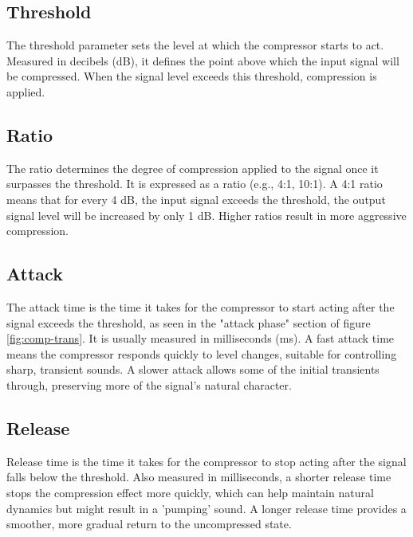\documentclass[10pt]{article}
\begin{document}
\begin{multicols*}{2}
            \subsection{Threshold}
                The threshold parameter sets the level at which the compressor starts to act. Measured in decibels (dB), it defines the point above which the input signal will be compressed. When the signal level exceeds this threshold, compression is applied.

            \subsection{Ratio}
                The ratio determines the degree of compression applied to the signal once it surpasses the threshold. It is expressed as a ratio (e.g., 4:1, 10:1). A 4:1 ratio means that for every 4 dB, the input signal exceeds the threshold, the output signal level will be increased by only 1 dB. Higher ratios result in more aggressive compression.

            \subsection{Attack}
                The attack time is the time it takes for the compressor to start acting after the signal exceeds the threshold, as seen in the "attack phase" section of figure \ref{fig:comp-trans}. It is usually measured in milliseconds (ms). A fast attack time means the compressor responds quickly to level changes, suitable for controlling sharp, transient sounds. A slower attack allows some of the initial transients through, preserving more of the signal's natural character.

            \subsection{Release}
                Release time is the time it takes for the compressor to stop acting after the signal falls below the threshold. Also measured in milliseconds, a shorter release time stops the compression effect more quickly, which can help maintain natural dynamics but might result in a 'pumping' sound. A longer release time provides a smoother, more gradual return to the uncompressed state.
            
                \noindent
                \begin{minipage}{\linewidth}
                    \centering
                    
                    \label{fig:comp-trans}
                \end{minipage}


\end{multicols*}
\end{document}
